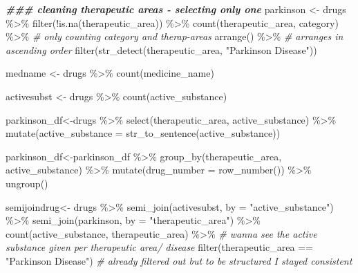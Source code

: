 \documentclass[
]{article}
\newenvironment{Shaded}{\begin{snugshade}}{\end{snugshade}}
\newcommand{\AttributeTok}[1]{\textcolor[rgb]{0.77,0.63,0.00}{#1}}
\newcommand{\CommentTok}[1]{\textcolor[rgb]{0.56,0.35,0.01}{\textit{#1}}}
\newcommand{\DocumentationTok}[1]{\textcolor[rgb]{0.56,0.35,0.01}{\textbf{\textit{#1}}}}
\newcommand{\FunctionTok}[1]{\textcolor[rgb]{0.00,0.00,0.00}{#1}}
\newcommand{\NormalTok}[1]{#1}
\newcommand{\OtherTok}[1]{\textcolor[rgb]{0.56,0.35,0.01}{#1}}
\newcommand{\SpecialCharTok}[1]{\textcolor[rgb]{0.00,0.00,0.00}{#1}}
\newcommand{\StringTok}[1]{\textcolor[rgb]{0.31,0.60,0.02}{#1}}
\begin{document}
\begin{Shaded}
\begin{Highlighting}[]
\DocumentationTok{\#\#\# cleaning therapeutic areas {-} selecting only one}
\NormalTok{ parkinson }\OtherTok{\textless{}{-}}\NormalTok{ drugs }\SpecialCharTok{\%\textgreater{}\%} 
 \FunctionTok{filter}\NormalTok{(}\SpecialCharTok{!}\FunctionTok{is.na}\NormalTok{(therapeutic\_area)) }\SpecialCharTok{\%\textgreater{}\%}
  \FunctionTok{count}\NormalTok{(therapeutic\_area, category) }\SpecialCharTok{\%\textgreater{}\%} \CommentTok{\# only counting category and therap{-}areas }
  \FunctionTok{arrange}\NormalTok{() }\SpecialCharTok{\%\textgreater{}\%} \CommentTok{\# arranges in ascending order}
  \FunctionTok{filter}\NormalTok{(}\FunctionTok{str\_detect}\NormalTok{(therapeutic\_area, }\StringTok{"Parkinson Disease"}\NormalTok{))}
 
\NormalTok{ medname }\OtherTok{\textless{}{-}}\NormalTok{ drugs }\SpecialCharTok{\%\textgreater{}\%} 
  \FunctionTok{count}\NormalTok{(medicine\_name) }
   
\NormalTok{ activesubst }\OtherTok{\textless{}{-}}\NormalTok{ drugs }\SpecialCharTok{\%\textgreater{}\%} 
  \FunctionTok{count}\NormalTok{(active\_substance)}
 
\NormalTok{parkinson\_df}\OtherTok{\textless{}{-}}\NormalTok{drugs }\SpecialCharTok{\%\textgreater{}\%} 
  \FunctionTok{select}\NormalTok{(therapeutic\_area, active\_substance) }\SpecialCharTok{\%\textgreater{}\%} 
  \FunctionTok{mutate}\NormalTok{(}\AttributeTok{active\_substance =} \FunctionTok{str\_to\_sentence}\NormalTok{(active\_substance))}

\NormalTok{parkinson\_df}\OtherTok{\textless{}{-}}\NormalTok{parkinson\_df }\SpecialCharTok{\%\textgreater{}\%} 
  \FunctionTok{group\_by}\NormalTok{(therapeutic\_area, active\_substance) }\SpecialCharTok{\%\textgreater{}\%} 
  \FunctionTok{mutate}\NormalTok{(}\AttributeTok{drug\_number =} \FunctionTok{row\_number}\NormalTok{()) }\SpecialCharTok{\%\textgreater{}\%} 
  \FunctionTok{ungroup}\NormalTok{()}
 
\NormalTok{semijoindrug}\OtherTok{\textless{}{-}}\NormalTok{ drugs }\SpecialCharTok{\%\textgreater{}\%} 
  \FunctionTok{semi\_join}\NormalTok{(activesubst, }\AttributeTok{by =} \StringTok{"active\_substance"}\NormalTok{) }\SpecialCharTok{\%\textgreater{}\%} 
  \FunctionTok{semi\_join}\NormalTok{(parkinson, }\AttributeTok{by =} \StringTok{"therapeutic\_area"}\NormalTok{) }\SpecialCharTok{\%\textgreater{}\%} 
  \FunctionTok{count}\NormalTok{(active\_substance, therapeutic\_area) }\SpecialCharTok{\%\textgreater{}\%} \CommentTok{\# wanna see the active substance given per therapeutic area/ disease}
  \FunctionTok{filter}\NormalTok{(therapeutic\_area }\SpecialCharTok{==} \StringTok{"Parkinson Disease"}\NormalTok{) }\CommentTok{\# already filtered out but to be structured I stayed consistent}
\end{Highlighting}
\end{Shaded}
\end{document}
